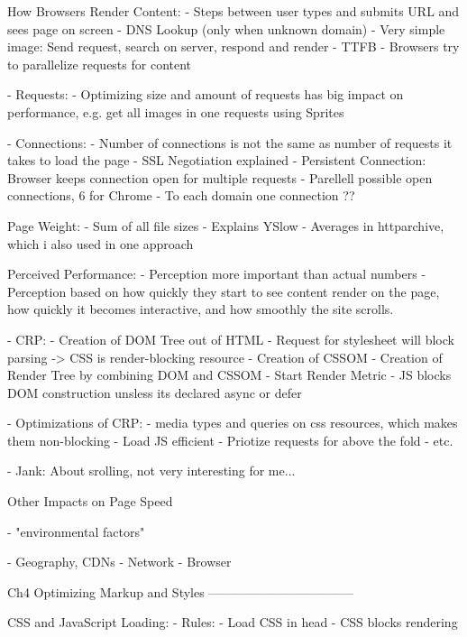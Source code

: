 
How Browsers Render Content:
- Steps between user types and submits URL and sees page on screen
- DNS Lookup (only when unknown domain)
- Very simple image: Send request, search on server, respond and render
- TTFB
- Browsers try to parallelize requests for content

- Requests:
- Optimizing size and amount of requests has big impact on performance, e.g. get all images in one requests using Sprites

- Connections:
- Number of connections is not the same as number of requests it takes to load the page
- SSL Negotiation explained
- Persistent Connection: Browser keeps connection open for multiple requests
- Parellell possible open connections, 6 for Chrome
- To each domain one connection ??


Page Weight:
- Sum of all file sizes
- Explains YSlow
- Averages in httparchive, which i also used in one approach %


Perceived Performance:
- Perception more important than actual numbers
- Perception based on how quickly they start to see content render on the page, how quickly it becomes interactive, and how smoothly the site scrolls.

- CRP:
- Creation of DOM Tree out of HTML
- Request for stylesheet will block parsing -> CSS is render-blocking resource
- Creation of CSSOM
- Creation of Render Tree by combining DOM and CSSOM
- Start Render Metric
- JS blocks DOM construction unsless its declared async or defer

- Optimizations of CRP:
- media types and queries on css resources, which makes them non-blocking
- Load JS efficient
- Priotize requests for above the fold
- etc. %


- Jank: About srolling, not very interesting for me...


Other Impacts on Page Speed

- "environmental factors"

- Geography, CDNs
- Network
- Browser




Ch4 Optimizing Markup and Styles
-----------------------------------

CSS and JavaScript Loading:
- Rules:
- Load CSS in head
- CSS blocks rendering

